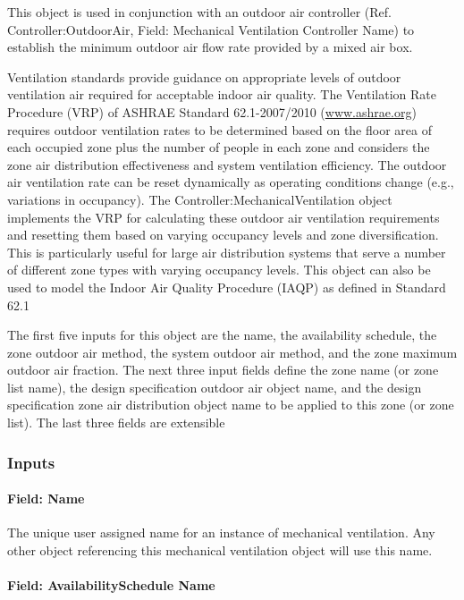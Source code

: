 This object is used in conjunction with an outdoor air controller (Ref. Controller:OutdoorAir, Field: Mechanical Ventilation Controller Name) to establish the minimum outdoor air flow rate provided by a mixed air box.

Ventilation standards provide guidance on appropriate levels of outdoor ventilation air required for acceptable indoor air quality. The Ventilation Rate Procedure (VRP) of ASHRAE Standard 62.1-2007/2010 (\href{http://www.ashrae.org}{www.ashrae.org}) requires outdoor ventilation rates to be determined based on the floor area of each occupied zone plus the number of people in each zone and considers the zone air distribution effectiveness and system ventilation efficiency. The outdoor air ventilation rate can be reset dynamically as operating conditions change (e.g., variations in occupancy). The Controller:MechanicalVentilation object implements the VRP for calculating these outdoor air ventilation requirements and resetting them based on varying occupancy levels and zone diversification. This is particularly useful for large air distribution systems that serve a number of different zone types with varying occupancy levels. This object can also be used to model the Indoor Air Quality Procedure (IAQP) as defined in Standard 62.1

The first five inputs for this object are the name, the availability schedule, the zone outdoor air method, the system outdoor air method, and the zone maximum outdoor air fraction. The next three input fields define the zone name (or zone list name), the design specification outdoor air object name, and the design specification zone air distribution object name to be applied to this zone (or zone list). The last three fields are extensible

\subsubsection{Inputs}\label{inputs-2-007}

\paragraph{Field: Name}\label{field-name-2-006}

The unique user assigned name for an instance of mechanical ventilation. Any other object referencing this mechanical ventilation object will use this name.

\paragraph{Field: AvailabilitySchedule Name}\label{field-availabilityschedule-name}

